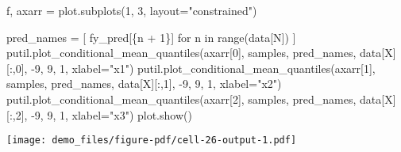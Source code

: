 \documentclass[
  letterpaper,
  DIV=11,
  numbers=noendperiod]{scrartcl}
\newenvironment{Shaded}{\begin{snugshade}}{\end{snugshade}}
\newcommand{\BuiltInTok}[1]{\textcolor[rgb]{0.00,0.23,0.31}{#1}}
\newcommand{\ControlFlowTok}[1]{\textcolor[rgb]{0.00,0.23,0.31}{#1}}
\newcommand{\DecValTok}[1]{\textcolor[rgb]{0.68,0.00,0.00}{#1}}
\newcommand{\KeywordTok}[1]{\textcolor[rgb]{0.00,0.23,0.31}{#1}}
\newcommand{\NormalTok}[1]{\textcolor[rgb]{0.00,0.23,0.31}{#1}}
\newcommand{\OperatorTok}[1]{\textcolor[rgb]{0.37,0.37,0.37}{#1}}
\newcommand{\SpecialCharTok}[1]{\textcolor[rgb]{0.37,0.37,0.37}{#1}}
\newcommand{\SpecialStringTok}[1]{\textcolor[rgb]{0.13,0.47,0.30}{#1}}
\newcommand{\StringTok}[1]{\textcolor[rgb]{0.13,0.47,0.30}{#1}}
\begin{document}
\begin{Shaded}
\begin{Highlighting}[]
\NormalTok{f, axarr }\OperatorTok{=}\NormalTok{ plot.subplots(}\DecValTok{1}\NormalTok{, }\DecValTok{3}\NormalTok{, layout}\OperatorTok{=}\StringTok{"constrained"}\NormalTok{)}

\NormalTok{pred\_names }\OperatorTok{=}\NormalTok{ [ }\SpecialStringTok{f\textquotesingle{}y\_pred[}\SpecialCharTok{\{}\NormalTok{n }\OperatorTok{+} \DecValTok{1}\SpecialCharTok{\}}\SpecialStringTok{]\textquotesingle{}} \ControlFlowTok{for}\NormalTok{ n }\KeywordTok{in} \BuiltInTok{range}\NormalTok{(data[}\StringTok{\textquotesingle{}N\textquotesingle{}}\NormalTok{]) ]}
\NormalTok{putil.plot\_conditional\_mean\_quantiles(axarr[}\DecValTok{0}\NormalTok{], samples, pred\_names,}
\NormalTok{                                      data[}\StringTok{\textquotesingle{}X\textquotesingle{}}\NormalTok{][:,}\DecValTok{0}\NormalTok{], }\OperatorTok{{-}}\DecValTok{9}\NormalTok{, }\DecValTok{9}\NormalTok{, }\DecValTok{1}\NormalTok{,}
\NormalTok{                                      xlabel}\OperatorTok{=}\StringTok{"x1"}\NormalTok{)}
\NormalTok{putil.plot\_conditional\_mean\_quantiles(axarr[}\DecValTok{1}\NormalTok{], samples, pred\_names,}
\NormalTok{                                      data[}\StringTok{\textquotesingle{}X\textquotesingle{}}\NormalTok{][:,}\DecValTok{1}\NormalTok{], }\OperatorTok{{-}}\DecValTok{9}\NormalTok{, }\DecValTok{9}\NormalTok{, }\DecValTok{1}\NormalTok{,}
\NormalTok{                                      xlabel}\OperatorTok{=}\StringTok{"x2"}\NormalTok{)}
\NormalTok{putil.plot\_conditional\_mean\_quantiles(axarr[}\DecValTok{2}\NormalTok{], samples, pred\_names,}
\NormalTok{                                      data[}\StringTok{\textquotesingle{}X\textquotesingle{}}\NormalTok{][:,}\DecValTok{2}\NormalTok{], }\OperatorTok{{-}}\DecValTok{9}\NormalTok{, }\DecValTok{9}\NormalTok{, }\DecValTok{1}\NormalTok{,}
\NormalTok{                                      xlabel}\OperatorTok{=}\StringTok{"x3"}\NormalTok{)}
\NormalTok{plot.show()}
\end{Highlighting}
\end{Shaded}

\texttt{[image: demo\_files/figure-pdf/cell-26-output-1.pdf]}
\end{document}
